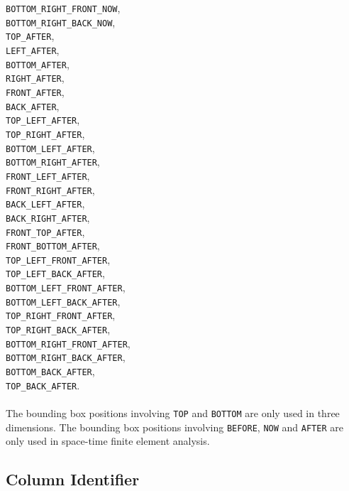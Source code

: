 \documentclass[10pt]{article}
\begin{document}
	\verb+BOTTOM_RIGHT_FRONT_NOW+,\\
	\verb+BOTTOM_RIGHT_BACK_NOW+,\\
	\verb+TOP_AFTER+,\\
	\verb+LEFT_AFTER+,\\
	\verb+BOTTOM_AFTER+,\\
	\verb+RIGHT_AFTER+,\\
	\verb+FRONT_AFTER+,\\
	\verb+BACK_AFTER+,\\
	\verb+TOP_LEFT_AFTER+,\\
	\verb+TOP_RIGHT_AFTER+,\\
	\verb+BOTTOM_LEFT_AFTER+,\\
	\verb+BOTTOM_RIGHT_AFTER+,\\
	\verb+FRONT_LEFT_AFTER+,\\
	\verb+FRONT_RIGHT_AFTER+,\\
	\verb+BACK_LEFT_AFTER+,\\
	\verb+BACK_RIGHT_AFTER+,\\
	\verb+FRONT_TOP_AFTER+,\\
	\verb+FRONT_BOTTOM_AFTER+,\\
	\verb+TOP_LEFT_FRONT_AFTER+,\\
	\verb+TOP_LEFT_BACK_AFTER+,\\
	\verb+BOTTOM_LEFT_FRONT_AFTER+,\\
	\verb+BOTTOM_LEFT_BACK_AFTER+,\\
	\verb+TOP_RIGHT_FRONT_AFTER+,\\
	\verb+TOP_RIGHT_BACK_AFTER+,\\
	\verb+BOTTOM_RIGHT_FRONT_AFTER+,\\
	\verb+BOTTOM_RIGHT_BACK_AFTER+,\\
	\verb+BOTTOM_BACK_AFTER+,\\
	\verb+TOP_BACK_AFTER+.
	
	\paragraph{} The bounding box positions involving \verb+TOP+ and \verb+BOTTOM+ are only used in three dimensions. The bounding box positions involving \verb+BEFORE+, \verb+NOW+ and \verb+AFTER+ are only used in space-time finite element analysis.

\subsection{Column Identifier}
\end{document}
